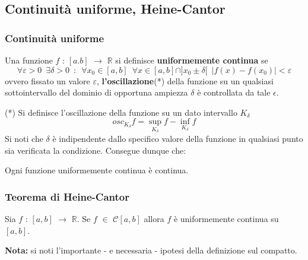 \documentclass[10pt]{article}
\theoremstyle{plain}
\begin{document}
\subsection{Continuità uniforme, Heine-Cantor}
\subsubsection{Continuità uniforme}
\begin{defin}
    Una funzione $f$ : $[a.b]$ $\rightarrow$ $\mathbb{R}$ si definisce \textbf{uniformemente continua} se
    \[\forall \varepsilon > 0 \enspace \exists \delta > 0 \enspace : \enspace \forall x_0 \in [a,b] \enspace \forall x \in [a,b] \cap ]x_0 \pm \delta[ \enspace |f(x) - f(x_0)| < \varepsilon\]
    ovvero fissato un valore $\varepsilon$, \textbf{l'oscillazione}(*) della funzione su un qualsiasi sottointervallo del dominio di opportuna ampiezza $\delta$ è controllata da tale $\epsilon$.
\end{defin}
(*) Si definisce l'oscillazione della funzione su un dato intervallo $K_\delta$
\[osc_{K_\delta} f = \sup\limits_{K_\delta} f - \inf\limits_{K_\delta} f\]
Si noti che $\delta$ è indipendente dallo specifico valore della funzione in qualsiasi punto sia verificata la condizione. Consegue dunque che:

\begin{oss}
    Ogni funzione uniformemente continua è continua.
\end{oss}

\subsubsection{Teorema di Heine-Cantor}
\begin{ther}[di H.-C.]
    Sia $f$ : $[a,b]$ $\rightarrow$ $\mathbb{R}$. Se $f$ $\in$ $\mathcal{C}[a,b]$ allora $f$ è uniformemente continua su $[a,b]$.
\end{ther}
\textbf{Nota: } si noti l'importante - e necessaria - ipotesi della definizione sul compatto. 
\end{document}
